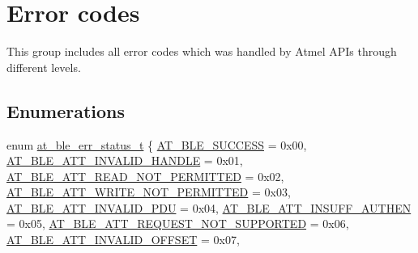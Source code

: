\hypertarget{group__error__codes__group}{}\section{Error codes}
\label{group__error__codes__group}


This group includes all error codes which was handled by Atmel A\+P\+Is through different levels.  


\subsection*{Enumerations}
\begin{DoxyCompactItemize}
\item 
enum \mbox{\hyperlink{group__error__codes__group_ga3b1db9b95feb157b3c188ca27fe76988}{at\+\_\+ble\+\_\+err\+\_\+status\+\_\+t}} \{ \newline
\mbox{\hyperlink{group__error__codes__group_gga3b1db9b95feb157b3c188ca27fe76988a7e3bfff5387331cd4f2c56cbcbbd7e19}{A\+T\+\_\+\+B\+L\+E\+\_\+\+S\+U\+C\+C\+E\+SS}} = 0x00, 
\mbox{\hyperlink{group__error__codes__group_gga3b1db9b95feb157b3c188ca27fe76988ab3d004424c74b1cd8185c2ea828b567b}{A\+T\+\_\+\+B\+L\+E\+\_\+\+A\+T\+T\+\_\+\+I\+N\+V\+A\+L\+I\+D\+\_\+\+H\+A\+N\+D\+LE}} = 0x01, 
\mbox{\hyperlink{group__error__codes__group_gga3b1db9b95feb157b3c188ca27fe76988ae0e64d248678460016580b8bb5879677}{A\+T\+\_\+\+B\+L\+E\+\_\+\+A\+T\+T\+\_\+\+R\+E\+A\+D\+\_\+\+N\+O\+T\+\_\+\+P\+E\+R\+M\+I\+T\+T\+ED}} = 0x02, 
\mbox{\hyperlink{group__error__codes__group_gga3b1db9b95feb157b3c188ca27fe76988a03f13eac0270f2c9b70f4f07a55c2a5e}{A\+T\+\_\+\+B\+L\+E\+\_\+\+A\+T\+T\+\_\+\+W\+R\+I\+T\+E\+\_\+\+N\+O\+T\+\_\+\+P\+E\+R\+M\+I\+T\+T\+ED}} = 0x03, 
\newline
\mbox{\hyperlink{group__error__codes__group_gga3b1db9b95feb157b3c188ca27fe76988a22fdffcf9ed97a6b3e68a4fe1584492e}{A\+T\+\_\+\+B\+L\+E\+\_\+\+A\+T\+T\+\_\+\+I\+N\+V\+A\+L\+I\+D\+\_\+\+P\+DU}} = 0x04, 
\mbox{\hyperlink{group__error__codes__group_gga3b1db9b95feb157b3c188ca27fe76988ad426a0726fdddda981cb12787137b09c}{A\+T\+\_\+\+B\+L\+E\+\_\+\+A\+T\+T\+\_\+\+I\+N\+S\+U\+F\+F\+\_\+\+A\+U\+T\+H\+EN}} = 0x05, 
\mbox{\hyperlink{group__error__codes__group_gga3b1db9b95feb157b3c188ca27fe76988adbee42ca537610aa81c60d6eea54b0f7}{A\+T\+\_\+\+B\+L\+E\+\_\+\+A\+T\+T\+\_\+\+R\+E\+Q\+U\+E\+S\+T\+\_\+\+N\+O\+T\+\_\+\+S\+U\+P\+P\+O\+R\+T\+ED}} = 0x06, 
\mbox{\hyperlink{group__error__codes__group_gga3b1db9b95feb157b3c188ca27fe76988a2c5a41ffff30ffbe050bd4b78fa18f52}{A\+T\+\_\+\+B\+L\+E\+\_\+\+A\+T\+T\+\_\+\+I\+N\+V\+A\+L\+I\+D\+\_\+\+O\+F\+F\+S\+ET}} = 0x07, 

\end{DoxyCompactItemize}
